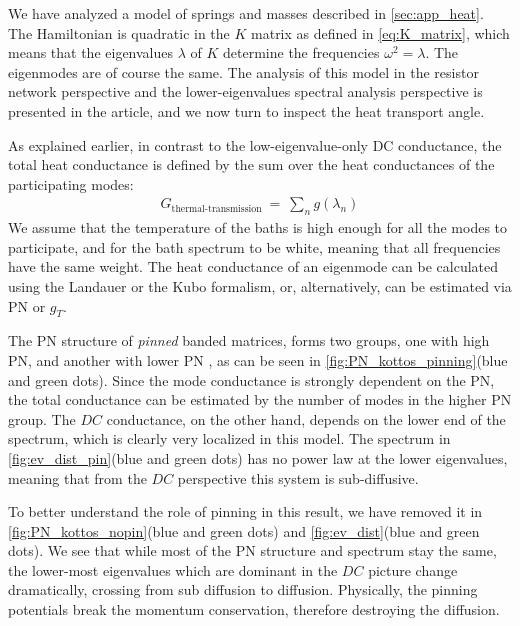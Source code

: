 We have analyzed a model of springs and masses described in \autoref{sec:app_heat}.
The Hamiltonian is quadratic in the $K$ matrix as defined in \autoref{eq:K_matrix},
which means that the eigenvalues $\lambda$ of $K$ determine the frequencies $\omega^2 = \lambda$.
The eigenmodes are of course the same. The analysis of this model in the resistor network perspective
and the lower-eigenvalues spectral analysis perspective is presented in the article, and we now
turn to inspect the heat transport angle.


As explained earlier, in contrast to the low-eigenvalue-only DC conductance, 
the total heat conductance is defined by the
sum over the heat conductances of the participating modes:
%
\begin{align}
G_{\textrm{thermal-transmission}} \ =\ \sum_n g(\lambda_n)
\end{align}
%
We assume that the temperature of the baths is high enough for all the modes to
participate, and for the bath spectrum to be white, meaning that all frequencies
have the same weight. The heat conductance of an eigenmode can be calculated
using the Landauer or the Kubo formalism, or, alternatively, can be estimated
via PN or $g_T$.


The PN structure of \emph{pinned}\cite{roy_role_2008} banded matrices,
forms two groups, one with high PN, and another with lower PN \cite{bodyfelt_unpub},
as can be seen in \autoref{fig:PN_kottos_pinning}(blue and green dots). Since the mode conductance 
is strongly dependent on the PN, the total conductance can be estimated
by the number of modes in the higher PN group. The $DC$ conductance, on the
other hand, depends on the lower end of the spectrum, which is clearly very localized
in this model. The spectrum in \autoref{fig:ev_dist_pin}(blue and green dots) has no power law
at the lower eigenvalues, meaning that from the $DC$ perspective this system is sub-diffusive.



To better understand the role of pinning in this result, we have
removed it in \autoref{fig:PN_kottos_nopin}(blue and green dots) and 
\autoref{fig:ev_dist}(blue and green dots). We see that 
while most of the PN structure and spectrum stay the same, the lower-most eigenvalues
which are dominant in the $DC$ picture change dramatically, crossing from sub diffusion
to diffusion. Physically, the pinning potentials break the momentum conservation,
therefore destroying the diffusion.



